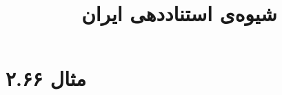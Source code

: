 \documentclass[a4paper,10pt]{article}
\begin{document}
\title{شیوه‌ی استناددهی ایران}
\author{}
\date{}
\maketitle



\section*{مثال ۲.۶۶}

\cite{جبلی1339}\\
\cite{فرد1370}\\
\cite{سینایی1382}\\
\\
\\
\\






\end{document}
